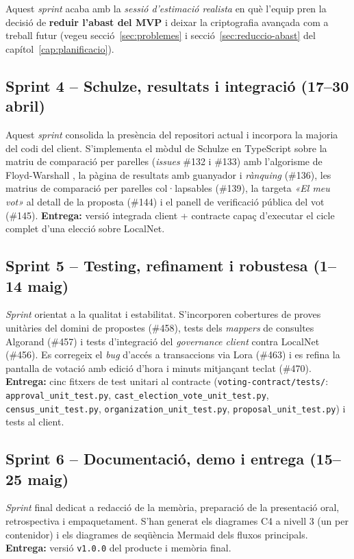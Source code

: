 Aquest \emph{sprint} acaba amb la \emph{sessió d'estimació realista}
en què l'equip pren la decisió de \textbf{reduir l'abast del \ac{MVP}}
i deixar la criptografia avançada com a treball futur (vegeu
secció~\ref{sec:problemes} i secció~\ref{sec:reduccio-abast} del
capítol~\ref{cap:planificacio}).

\subsection{Sprint 4 -- Schulze, resultats i integració (17--30 abril)}

Aquest \emph{sprint} consolida la presència del repositori actual i
incorpora la majoria del codi del client. S'implementa el mòdul de
Schulze en TypeScript sobre la matriu de comparació per parelles
(\emph{issues} \#132 i \#133) amb l'algorisme de Floyd-Warshall
\cite{floyd1962algorithm}, la pàgina de resultats amb guanyador i
\emph{rànquing} (\#136), les matrius de comparació per parelles
col·lapsables (\#139), la targeta \emph{«El meu vot»} al detall de la
proposta (\#144) i el panell de verificació pública del vot (\#145).
\textbf{Entrega:} versió integrada client + contracte capaç d'executar
el cicle complet d'una elecció sobre LocalNet.

\subsection{Sprint 5 -- Testing, refinament i robustesa (1--14 maig)}

\emph{Sprint} orientat a la qualitat i estabilitat. S'incorporen
cobertures de proves unitàries del domini de propostes (\#458), tests
dels \emph{mappers} de consultes Algorand (\#457) i tests d'integració
del \emph{governance client} contra LocalNet (\#456). Es corregeix
el \emph{bug} d'accés a transaccions via Lora (\#463) i es refina la
pantalla de votació amb edició d'hora i minuts mitjançant teclat
(\#470). \textbf{Entrega:} cinc fitxers de test unitari al contracte
(\texttt{voting-contract/tests/}: \texttt{approval\_unit\_test.py},
\texttt{cast\_election\_vote\_unit\_test.py},
\texttt{census\_unit\_test.py}, \texttt{organization\_unit\_test.py},
\texttt{proposal\_unit\_test.py}) i tests al client.

\subsection{Sprint 6 -- Documentació, demo i entrega (15--25 maig)}

\emph{Sprint} final dedicat a redacció de la memòria, preparació de la
presentació oral, retrospectiva i empaquetament. S'han generat els
diagrames C4 a nivell 3 (un per contenidor) i els diagrames de
seqüència Mermaid dels fluxos principals. \textbf{Entrega:} versió
\texttt{v1.0.0} del producte i memòria final.

